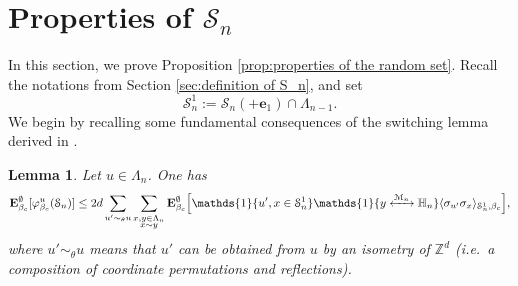 \documentclass[10pt,a4paper]{amsart}
\numberwithin{equation}{section}
\newtheorem{Lem}[Thm]{Lemma}
\newcommand{\connect}{\xleftrightarrow}
\begin{document}
\section{Properties of $\mathcal S_n$}\label{sec: properties of random set}
In this section, we prove Proposition \ref{prop:properties of the random set}. Recall the notations from Section \ref{sec:definition of S_n}, and set
\begin{equation} 
\mathcal S_n^1:=\mathcal S_n(+\mathbf{e}_1)\cap \Lambda_{n-1}.
\end{equation}
 We begin by recalling some fundamental consequences of the switching lemma derived in \cite{DuminilPanis2024newLB}. 
\begin{Lem}\label{lem:random phi moved} Let $u\in \Lambda_n$. One has
\begin{equation}
	\mathbf E_{\beta_c}^\emptyset[\varphi_{\beta_c}^u(\mathcal S_n)]\leq 2d\sum_{u'\sim_{\theta}u}\sum_{\substack{x,y\in \Lambda_n\\x\sim y}}\mathbf E_{\beta_c}^\emptyset\Big[\mathds{1}\{u',x\in \mathcal S_n^1\}\mathds{1}\{y\connect{\mathcal M_n\:}\mathbb H_n\}\langle \sigma_{u'}\sigma_x\rangle_{\mathcal S_n^1,\beta_c}\Big],
\end{equation}
where $u'\sim_\theta u$ means that $u'$ can be obtained from $u$ by an 
isometry of $\mathbb{Z}^d$ (i.e.\ a composition of coordinate permutations 
and reflections).\end{Lem}
\end{document}
